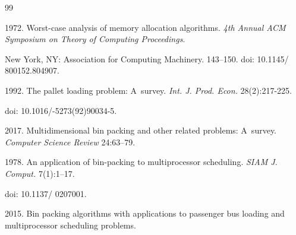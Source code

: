 \vspace*{-6pt}



\renewcommand{\bibname}{\protect\rmfamily References}




{\small\frenchspacing

{ %


\begin{thebibliography}{99}



\vspace*{-4pt}





 1972. Worst-case analysis of memory allocation algorithms. \textit{4th Annual ACM Symposium on Theory of Computing Proceedings}. 

 New York, NY: Association for Computing Machinery. 143--150. doi: 10.1145\!/ 800152.804907.




 1992. The pallet loading problem: A~survey. \textit{Int. J. Prod. Econ.} 28(2):217-225. 

doi: 10.1016\!/-5273(92)90034-5.





 2017. Multidimensional bin packing and other related problems: A~survey. \textit{Computer Science Review}  24:63--79.





 1978. An application of bin-packing to multiprocessor scheduling. \textit{SIAM J. Comput.} 7(1):1--17. 

 doi: 10.1137\!/ 0207001.




 2015. Bin packing algorithms with applications to passenger bus loading and multiprocessor scheduling problems. 


\end{thebibliography}}}
